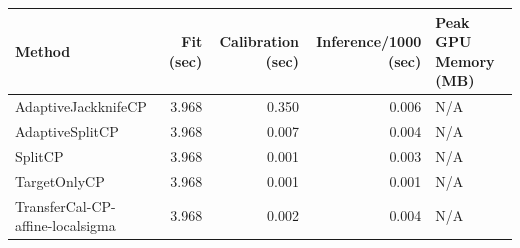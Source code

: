 \begin{tabular}{lrrrl}
\toprule
Method & Fit (sec) & Calibration (sec) & Inference/1000 (sec) & Peak GPU Memory (MB) \\
\midrule
AdaptiveJackknifeCP & 3.968 & 0.350 & 0.006 & N/A \\
AdaptiveSplitCP & 3.968 & 0.007 & 0.004 & N/A \\
SplitCP & 3.968 & 0.001 & 0.003 & N/A \\
TargetOnlyCP & 3.968 & 0.001 & 0.001 & N/A \\
TransferCal-CP-affine-localsigma & 3.968 & 0.002 & 0.004 & N/A \\
\bottomrule
\end{tabular}
